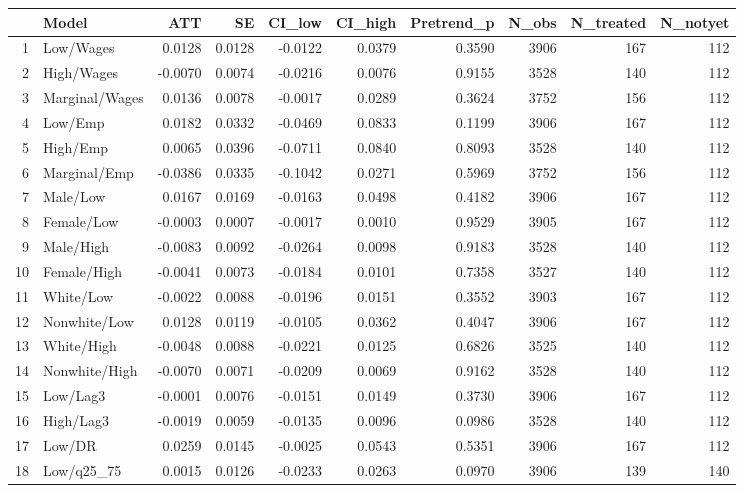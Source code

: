 \begin{table}[ht]
\centering
\begin{tabular}{rlrrrrrrrr}
  \hline
 & Model & ATT & SE & CI\_low & CI\_high & Pretrend\_p & N\_obs & N\_treated & N\_notyet \\ 
  \hline
1 & Low/Wages & 0.0128 & 0.0128 & -0.0122 & 0.0379 & 0.3590 & 3906 & 167 & 112 \\ 
  2 & High/Wages & -0.0070 & 0.0074 & -0.0216 & 0.0076 & 0.9155 & 3528 & 140 & 112 \\ 
  3 & Marginal/Wages & 0.0136 & 0.0078 & -0.0017 & 0.0289 & 0.3624 & 3752 & 156 & 112 \\ 
  4 & Low/Emp & 0.0182 & 0.0332 & -0.0469 & 0.0833 & 0.1199 & 3906 & 167 & 112 \\ 
  5 & High/Emp & 0.0065 & 0.0396 & -0.0711 & 0.0840 & 0.8093 & 3528 & 140 & 112 \\ 
  6 & Marginal/Emp & -0.0386 & 0.0335 & -0.1042 & 0.0271 & 0.5969 & 3752 & 156 & 112 \\ 
  7 & Male/Low & 0.0167 & 0.0169 & -0.0163 & 0.0498 & 0.4182 & 3906 & 167 & 112 \\ 
  8 & Female/Low & -0.0003 & 0.0007 & -0.0017 & 0.0010 & 0.9529 & 3905 & 167 & 112 \\ 
  9 & Male/High & -0.0083 & 0.0092 & -0.0264 & 0.0098 & 0.9183 & 3528 & 140 & 112 \\ 
  10 & Female/High & -0.0041 & 0.0073 & -0.0184 & 0.0101 & 0.7358 & 3527 & 140 & 112 \\ 
  11 & White/Low & -0.0022 & 0.0088 & -0.0196 & 0.0151 & 0.3552 & 3903 & 167 & 112 \\ 
  12 & Nonwhite/Low & 0.0128 & 0.0119 & -0.0105 & 0.0362 & 0.4047 & 3906 & 167 & 112 \\ 
  13 & White/High & -0.0048 & 0.0088 & -0.0221 & 0.0125 & 0.6826 & 3525 & 140 & 112 \\ 
  14 & Nonwhite/High & -0.0070 & 0.0071 & -0.0209 & 0.0069 & 0.9162 & 3528 & 140 & 112 \\ 
  15 & Low/Lag3 & -0.0001 & 0.0076 & -0.0151 & 0.0149 & 0.3730 & 3906 & 167 & 112 \\ 
  16 & High/Lag3 & -0.0019 & 0.0059 & -0.0135 & 0.0096 & 0.0986 & 3528 & 140 & 112 \\ 
  17 & Low/DR & 0.0259 & 0.0145 & -0.0025 & 0.0543 & 0.5351 & 3906 & 167 & 112 \\ 
  18 & Low/q25\_75 & 0.0015 & 0.0126 & -0.0233 & 0.0263 & 0.0970 & 3906 & 139 & 140 \\ 

\end{tabular}
\end{table}
